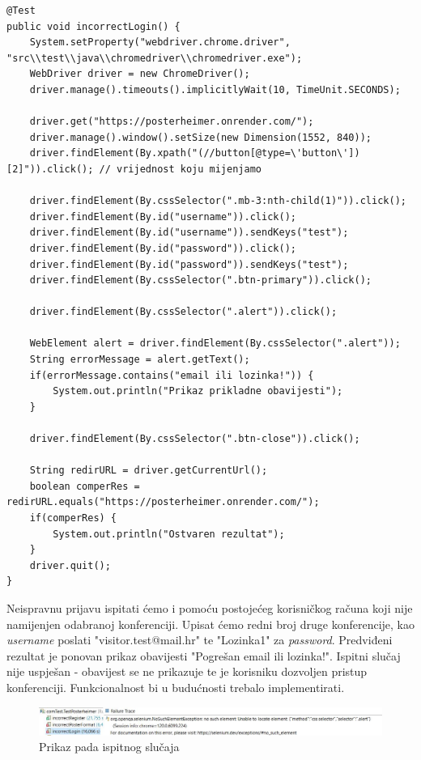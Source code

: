 			\begin{lstlisting}
@Test
public void incorrectLogin() {
	System.setProperty("webdriver.chrome.driver", "src\\test\\java\\chromedriver\\chromedriver.exe");
	WebDriver driver = new ChromeDriver();
	driver.manage().timeouts().implicitlyWait(10, TimeUnit.SECONDS);
	
	driver.get("https://posterheimer.onrender.com/");
	driver.manage().window().setSize(new Dimension(1552, 840));
	driver.findElement(By.xpath("(//button[@type=\'button\'])[2]")).click(); // vrijednost koju mijenjamo

	driver.findElement(By.cssSelector(".mb-3:nth-child(1)")).click();
	driver.findElement(By.id("username")).click();
	driver.findElement(By.id("username")).sendKeys("test");
	driver.findElement(By.id("password")).click();
	driver.findElement(By.id("password")).sendKeys("test");
	driver.findElement(By.cssSelector(".btn-primary")).click();
	
	driver.findElement(By.cssSelector(".alert")).click();

	WebElement alert = driver.findElement(By.cssSelector(".alert"));
	String errorMessage = alert.getText();
	if(errorMessage.contains("email ili lozinka!")) {
		System.out.println("Prikaz prikladne obavijesti");
	}
	
	driver.findElement(By.cssSelector(".btn-close")).click();
	
	String redirURL = driver.getCurrentUrl();
	boolean comperRes = redirURL.equals("https://posterheimer.onrender.com/");
	if(comperRes) {
		System.out.println("Ostvaren rezultat");
	}
	driver.quit();
}
			\end{lstlisting}
			
			Neispravnu prijavu ispitati ćemo i pomoću postojećeg korisničkog računa koji nije namijenjen odabranoj konferenciji. Upisat ćemo redni broj druge konferencije, kao \textit{username} poslati "visitor.test@mail.hr" te "Lozinka1" za \textit{password}. Predviđeni rezultat je ponovan prikaz obavijesti "Pogrešan email ili lozinka!". Ispitni slučaj nije uspješan - obavijest se ne prikazuje te je korisniku dozvoljen pristup konferenciji. Funkcionalnost bi u budućnosti trebalo implementirati.
			
			\begin{figure} [hbt!]
				\includegraphics[width=\linewidth]{Slike/incorrectLoginFail}
				\caption{Prikaz pada ispitnog slučaja}
			\end{figure}
			
